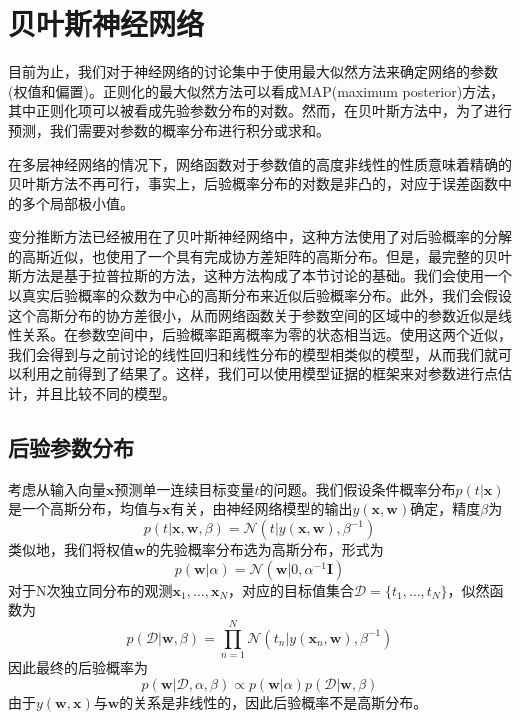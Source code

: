 \section{贝叶斯神经网络}
目前为止，我们对于神经网络的讨论集中于使用最大似然方法来确定网络的参数(权值和偏置)。正则化的最大似然方法可以看成MAP(maximum posterior)方法，其中正则化项可以被看成先验参数分布的对数。然而，在贝叶斯方法中，为了进行预测，我们需要对参数的概率分布进行积分或求和。

在多层神经网络的情况下，网络函数对于参数值的高度非线性的性质意味着精确的贝叶斯方法不再可行，事实上，后验概率分布的对数是非凸的，对应于误差函数中的多个局部极小值。

变分推断方法已经被用在了贝叶斯神经网络中，这种方法使用了对后验概率的分解的高斯近似，也使用了一个具有完成协方差矩阵的高斯分布。但是，最完整的贝叶斯方法是基于拉普拉斯的方法，这种方法构成了本节讨论的基础。我们会使用一个以真实后验概率的众数为中心的高斯分布来近似后验概率分布。此外，我们会假设这个高斯分布的协方差很小，从而网络函数关于参数空间的区域中的参数近似是线性关系。在参数空间中，后验概率距离概率为零的状态相当远。使用这两个近似，我们会得到与之前讨论的线性回归和线性分布的模型相类似的模型，从而我们就可以利用之前得到了结果了。这样，我们可以使用模型证据的框架来对参数进行点估计，并且比较不同的模型。
\subsection*{后验参数分布}
考虑从输入向量$\boldsymbol{x}$预测单一连续目标变量$t$的问题。我们假设条件概率分布$p(t|\boldsymbol{x})$是一个高斯分布，均值与$\boldsymbol{x}$有关，由神经网络模型的输出$y(\boldsymbol{x},\boldsymbol{w})$确定，精度$\beta$为
\begin{equation}
	p(t|\boldsymbol{x},\boldsymbol{w},\beta)=\mathcal{N}(t|y(\boldsymbol{x},\boldsymbol{w}),\beta^{-1})
\end{equation}
类似地，我们将权值$\boldsymbol{w}$的先验概率分布选为高斯分布，形式为
\begin{equation}
	p(\boldsymbol{w}|\alpha)=\mathcal{N}(\boldsymbol{w}|0,\alpha^{-1}\boldsymbol{I})
\end{equation}
对于N次独立同分布的观测$\boldsymbol{x}_1,\dots,\boldsymbol{x}_N$，对应的目标值集合$\mathcal{D}=\{t_1,\dots,t_N \}$，似然函数为
\begin{equation}
	p(\mathcal{D}|\boldsymbol{w},\beta)=\prod_{n=1}^{N}\mathcal{N}(t_n|y(\boldsymbol{x}_n,\boldsymbol{w}),\beta^{-1})
\end{equation}
因此最终的后验概率为
\begin{equation}
	p(\boldsymbol{w}|\mathcal{D},\alpha,\beta)\propto p(\boldsymbol{w}|\alpha)p(\mathcal{D}|\boldsymbol{w},\beta)
\end{equation}
由于$y(\boldsymbol{w},\boldsymbol{x})$与$\boldsymbol{w}$的关系是非线性的，因此后验概率不是高斯分布。


